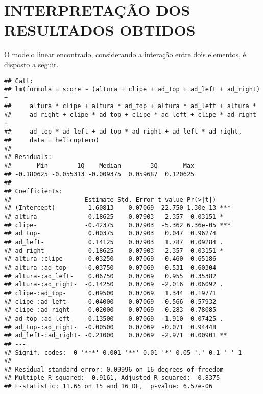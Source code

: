 \chapter{INTERPRETAÇÃO DOS RESULTADOS OBTIDOS}
\label{chap:resultados}
O modelo linear encontrado, considerando a interação entre dois elementos, é disposto a seguir.

\begin{knitrout}
\color{fgcolor}\begin{kframe}
\begin{verbatim}
## Call:
## lm(formula = score ~ (altura + clipe + ad_top + ad_left + ad_right) + 
##     altura * clipe + altura * ad_top + altura * ad_left + altura * 
##     ad_right + clipe * ad_top + clipe * ad_left + clipe * ad_right + 
##     ad_top * ad_left + ad_top * ad_right + ad_left * ad_right, 
##     data = helicoptero)
## 
## Residuals:
##       Min        1Q    Median        3Q       Max 
## -0.180625 -0.055313 -0.009375  0.059687  0.120625 
## 
## Coefficients:
##                    Estimate Std. Error t value Pr(>|t|)    
## (Intercept)         1.60813    0.07069  22.750 1.30e-13 ***
## altura-             0.18625    0.07903   2.357  0.03151 *  
## clipe-             -0.42375    0.07903  -5.362 6.36e-05 ***
## ad_top-             0.00375    0.07903   0.047  0.96274    
## ad_left-            0.14125    0.07903   1.787  0.09284 .  
## ad_right-           0.18625    0.07903   2.357  0.03151 *  
## altura-:clipe-     -0.03250    0.07069  -0.460  0.65186    
## altura-:ad_top-    -0.03750    0.07069  -0.531  0.60304    
## altura-:ad_left-    0.06750    0.07069   0.955  0.35382    
## altura-:ad_right-  -0.14250    0.07069  -2.016  0.06092 .  
## clipe-:ad_top-      0.09500    0.07069   1.344  0.19771    
## clipe-:ad_left-    -0.04000    0.07069  -0.566  0.57932    
## clipe-:ad_right-   -0.02000    0.07069  -0.283  0.78085    
## ad_top-:ad_left-   -0.13500    0.07069  -1.910  0.07425 .  
## ad_top-:ad_right-  -0.00500    0.07069  -0.071  0.94448    
## ad_left-:ad_right- -0.21000    0.07069  -2.971  0.00901 ** 
## ---
## Signif. codes:  0 '***' 0.001 '**' 0.01 '*' 0.05 '.' 0.1 ' ' 1
## 
## Residual standard error: 0.09996 on 16 degrees of freedom
## Multiple R-squared:  0.9161,	Adjusted R-squared:  0.8375 
## F-statistic: 11.65 on 15 and 16 DF,  p-value: 6.57e-06
\end{verbatim}
\end{kframe}
\end{knitrout}

